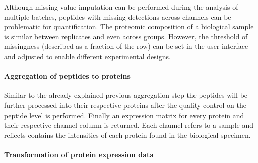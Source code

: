 \documentclass[
  11pt,
]{article}
\begin{document}
Although missing value imputation can be performed during the analysis
of multiple batches, peptides with missing detections across channels
can be problematic for quantification. The proteomic composition of a
biological sample is similar between replicates and even across groups.
However, the threshold of missingness (described as a fraction of the
row) can be set in the user interface and adjusted to enable different
experimental designs.

\hypertarget{aggregation-of-peptides-to-proteins}{%
\paragraph{Aggregation of peptides to
proteins}\label{aggregation-of-peptides-to-proteins}}

Similar to the already explained previous aggregation step the peptides
will be further processed into their respective proteins after the
quality control on the peptide level is performed. Finally an expression
matrix for every protein and their respective channel column is
returned. Each channel refers to a sample and reflects contains the
intensities of each protein found in the biological specimen.

\hypertarget{transformation-of-protein-expression-data}{%
\paragraph{Transformation of protein expression
data}\label{transformation-of-protein-expression-data}}
\end{document}
